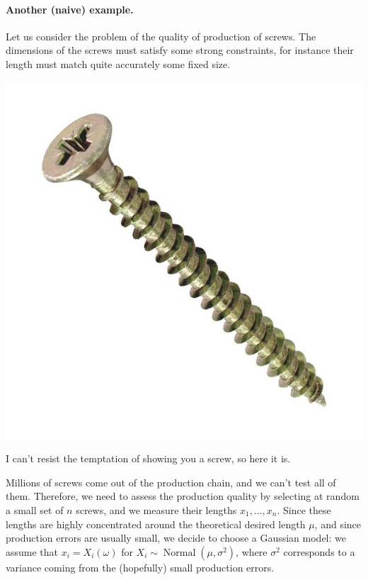 \documentclass[
	fontsize=11pt, %
	twoside=false, %
	numbers=noenddot, %
]{kaobook}
\DeclareMathOperator{\nor}{Normal}
\begin{document}
\paragraph{Another (naive) example.}

Let us consider the problem of the quality of production of screws. 
The dimensions of the screws must satisfy some strong constraints, for instance their length must match quite accurately some fixed size.%
%
\begin{marginfigure}%
	\includegraphics{screw.jpg}%
	\caption{I can't resist the temptation of showing you a screw, so here it is.}%
\end{marginfigure}%
Millions of screws come out of the production chain, and we can't test all of them.
Therefore, we need to assess the production quality by selecting at random a small set of $n$ screws, and we measure their lengths $x_1, \ldots, x_n$.
Since these lengths are highly concentrated around the theoretical desired length $\mu$, and since production errors are usually small, we decide to choose a Gaussian model: we assume that $x_i = X_i(\omega)$ for $X_i \sim \nor(\mu, \sigma^2)$, where $\sigma^2$ corresponds to a variance coming from the (hopefully) small production errors.
\end{document}
